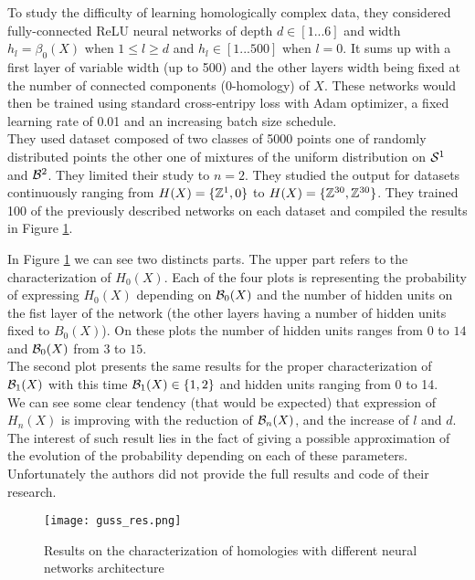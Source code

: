 \documentclass[12pt, a4paper]{article}
\begin{document}
To study the difficulty of learning homologically complex data, they considered fully-connected ReLU neural networks of depth $d \in [1 ... 6]$ and width $h_l = \beta_0(X)$ when $1 \le l \ge d$ and $h_l \in [1 ... 500]$ when $l = 0$. It sums up with a first layer of variable width (up to 500) and the other layers width being fixed at the number of connected components (0-homology) of $X$. These networks would then be trained using standard cross-entripy loss with Adam optimizer, a fixed learning rate of 0.01 and an increasing batch size schedule.\\

They used dataset composed of two classes of 5000 points one of randomly distributed points the other one of mixtures of the uniform distribution on $\S^1$ and $\B^2$. They limited their study to $n=2$. They studied the output for datasets continuously ranging from $H(X) = \{\Z^1, 0\}$ to $H(X) = \{\Z^{30}, \Z^{30}\}$. They trained 100 of the previously described networks on each dataset and compiled the results in Figure \ref{fig:guss_results}.


In Figure \ref{fig:guss_results} we can see two distincts parts. The upper part refers to the characterization of $H_0(X)$. Each of the four plots is representing the probability of expressing $H_0(X)$ depending on $\B_0(X)$ and the number of hidden units on the fist layer of the network (the other layers having a number of hidden units fixed to $B_0(X)$). On these plots the number of hidden units ranges from $0$ to $14$ and $\B_0(X)$ from $3$ to $15$.\\

The second plot presents the same results for the proper characterization of $\B_1(X)$ with this time $\B_1(X) \in \{1,2\}$ and hidden units ranging from $0$ to 14.\\

We can see some clear tendency (that would be expected) that expression of $H_n(X)$ is improving with the reduction of $\B_n(X)$, and the increase of $l$ and $d$. The interest of such result lies in the fact of giving a possible approximation of the evolution of the probability depending on each of these parameters.\\

Unfortunately the authors did not provide the full results and code of their research.

\begin{figure}[H]
  \centering
  \texttt{[image: guss\_res.png]}
  \caption{Results on the characterization of homologies with different neural networks architecture}
  \label{fig:guss_results}
  
\end{figure}
\newpage
\end{document}
